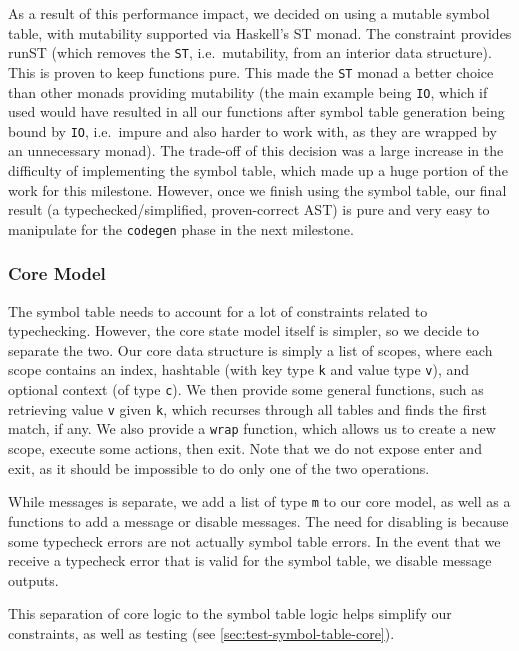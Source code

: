 \documentclass[11pt]{article}
\begin{document}
As a result of this performance impact, we decided on using a mutable
symbol table, with mutability supported via Haskell's
ST\cite{hackage:st} monad. The constraint provides
runST\cite{hackage:runst} (which removes the \texttt{ST}, i.e.\
mutability, from an interior data structure). This is
proven\cite{monadicstate} to keep functions pure. This made the
\texttt{ST} monad a better choice than other monads providing
mutability (the main example being \texttt{IO}, which if used would
have resulted in all our functions after symbol table generation being
bound by \texttt{IO}, i.e.\ impure and also harder to work with, as
they are wrapped by an unnecessary monad). The trade-off of this
decision was a large increase in the difficulty of implementing the
symbol table, which made up a huge portion of the work for this
milestone.  However, once we finish using the symbol table, our final
result (a typechecked/simplified, proven-correct AST) is pure and very
easy to manipulate for the \texttt{codegen} phase in the next
milestone.

\subsubsection{Core Model}

The symbol table needs to account for a lot of constraints related to
typechecking.  However, the core state model itself is simpler, so we
decide to separate the two.  Our core data structure is simply a list
of scopes, where each scope contains an index, hashtable (with key
type \texttt{k} and value type \texttt{v}), and optional context (of
type \texttt{c}).  We then provide some general functions, such as
retrieving value \texttt{v} given \texttt{k}, which recurses through
all tables and finds the first match, if any.  We also provide a
\texttt{wrap} function, which allows us to create a new scope, execute
some actions, then exit.  Note that we do not expose enter and exit,
as it should be impossible to do only one of the two operations.

While messages is separate, we add a list of type \texttt{m} to our
core model, as well as a functions to add a message or disable
messages.  The need for disabling is because some typecheck errors are
not actually symbol table errors.  In the event that we receive a
typecheck error that is valid for the symbol table, we disable message
outputs.

This separation of core logic to the symbol table logic helps simplify
our constraints, as well as testing (see
\ref{sec:test-symbol-table-core}).
\end{document}

